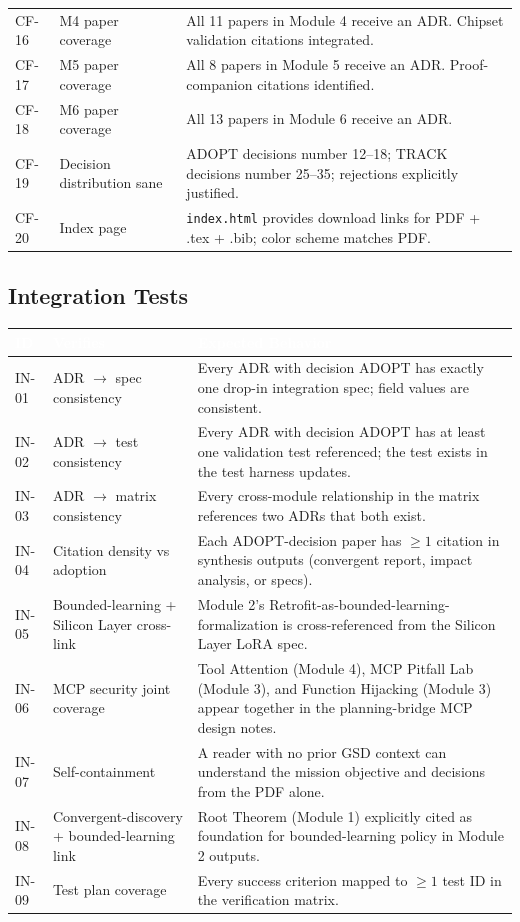 \documentclass[11pt,letterpaper]{article}
\newcommand{\tableheader}[1]{\textbf{\sffamily\textcolor{white}{#1}}}
\begin{document}
\begin{center}
\begin{tabularx}{\textwidth}{C{1.2cm}L{4cm}X}
CF-16 & M4 paper coverage & All 11 papers in Module 4 receive an ADR. Chipset validation citations integrated. \\
CF-17 & M5 paper coverage & All 8 papers in Module 5 receive an ADR. Proof-companion citations identified. \\
CF-18 & M6 paper coverage & All 13 papers in Module 6 receive an ADR. \\
CF-19 & Decision distribution sane & ADOPT decisions number 12--18; TRACK decisions number 25--35; rejections explicitly justified. \\
CF-20 & Index page & \texttt{index.html} provides download links for PDF + .tex + .bib; color scheme matches PDF. \\
\bottomrule
\end{tabularx}
\end{center}

\subsection{Integration Tests}

\begin{center}
\begin{tabularx}{\textwidth}{C{1.2cm}L{4cm}X}
\toprule
{}
\tableheader{ID} & \tableheader{Verifies} & \tableheader{Expected Behavior} \\
\midrule
IN-01 & ADR $\to$ spec consistency & Every ADR with decision ADOPT has exactly one drop-in integration spec; field values are consistent. \\
IN-02 & ADR $\to$ test consistency & Every ADR with decision ADOPT has at least one validation test referenced; the test exists in the test harness updates. \\
IN-03 & ADR $\to$ matrix consistency & Every cross-module relationship in the matrix references two ADRs that both exist. \\
IN-04 & Citation density vs adoption & Each ADOPT-decision paper has ${\geq}1$ citation in synthesis outputs (convergent report, impact analysis, or specs). \\
IN-05 & Bounded-learning + Silicon Layer cross-link & Module 2's Retrofit-as-bounded-learning-formalization is cross-referenced from the Silicon Layer LoRA spec. \\
IN-06 & MCP security joint coverage & Tool Attention (Module 4), MCP Pitfall Lab (Module 3), and Function Hijacking (Module 3) appear together in the planning-bridge MCP design notes. \\
IN-07 & Self-containment & A reader with no prior GSD context can understand the mission objective and decisions from the PDF alone. \\
IN-08 & Convergent-discovery + bounded-learning link & Root Theorem (Module 1) explicitly cited as foundation for bounded-learning policy in Module 2 outputs. \\
IN-09 & Test plan coverage & Every success criterion mapped to ${\geq}1$ test ID in the verification matrix. \\
\bottomrule
\end{tabularx}
\end{center}
\end{document}
